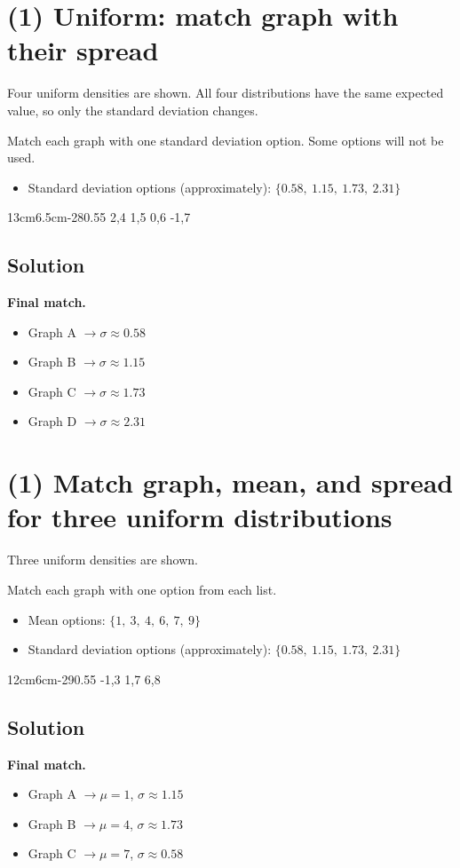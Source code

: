 \section{(1) Uniform: match graph with their spread}
Four uniform densities are shown. All four distributions have the same expected value, so only the standard deviation changes.

Match each graph with one standard deviation option. Some options will not be used.
\begin{itemize}
\item Standard deviation options (approximately): $\{0.58,\ 1.15,\ 1.73,\ 2.31\}$
\end{itemize}
\UniformFourGraph
{13cm}{6.5cm}{-2}{8}{0.55}
{2,4}
{1,5}
{0,6}
{-1,7}

\subsection*{Solution}
\textbf{Final match.}
\begin{itemize}
\item Graph A $\to \sigma\approx0.58$
\item Graph B $\to \sigma\approx1.15$
\item Graph C $\to \sigma\approx1.73$
\item Graph D $\to \sigma\approx2.31$
\end{itemize}

\section{(1) Match graph, mean, and spread for three uniform distributions}
Three uniform densities are shown.

Match each graph with one option from each list.
\begin{itemize}
\item Mean options: $\{1,\ 3,\ 4,\ 6,\ 7,\ 9\}$
\item Standard deviation options (approximately): $\{0.58,\ 1.15,\ 1.73,\ 2.31\}$
\end{itemize}
\UniformThreeGraph
{12cm}{6cm}{-2}{9}{0.55}
{-1,3}
{1,7}
{6,8}

\subsection*{Solution}
\textbf{Final match.}
\begin{itemize}
\item Graph A $\to \mu=1$, $\sigma\approx1.15$
\item Graph B $\to \mu=4$, $\sigma\approx1.73$
\item Graph C $\to \mu=7$, $\sigma\approx0.58$
\end{itemize}


